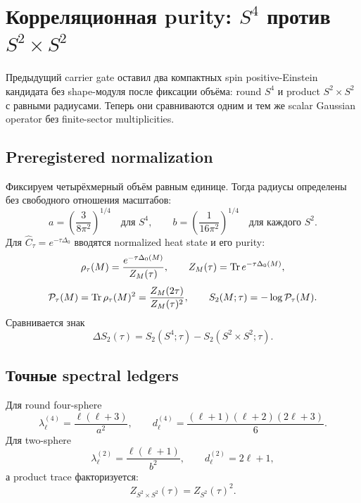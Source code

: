 \chapter{Корреляционная purity: \texorpdfstring{\(S^4\)}{S4} против \texorpdfstring{\(S^2\times S^2\)}{S2 x S2}}

Предыдущий carrier gate оставил два компактных spin positive-Einstein
кандидата без shape-модуля после фиксации объёма: round \(S^4\) и product
\(S^2\times S^2\) с равными радиусами. Теперь они сравниваются одним и тем
же scalar Gaussian operator без finite-sector multiplicities.

\section{Preregistered normalization}

Фиксируем четырёхмерный объём равным единице. Тогда радиусы определены без
свободного отношения масштабов:
\begin{equation}
 a=\left(\frac{3}{8\pi^2}\right)^{1/4}
 \quad\text{для }S^4,
 \qquad
 b=\left(\frac{1}{16\pi^2}\right)^{1/4}
 \quad\text{для каждого }S^2.
\end{equation}
Для \(\widehat C_\tau=e^{-\tau\Delta_0}\) вводятся normalized heat state и
его purity:
\begin{equation}
 \rho_\tau(M)=\frac{e^{-\tau\Delta_0(M)}}{Z_M(\tau)},
 \qquad
 Z_M(\tau)=\operatorname{Tr} e^{-\tau\Delta_0(M)},
\end{equation}
\begin{equation}
 \mathcal P_\tau(M)=\operatorname{Tr}\rho_\tau(M)^2
 =\frac{Z_M(2\tau)}{Z_M(\tau)^2},
 \qquad
 S_2(M;\tau)=-\log\mathcal P_\tau(M).
 \label{eq:carrier-renyi2-definition}
\end{equation}
Сравнивается знак
\begin{equation}
 \Delta S_2(\tau)
 =S_2(S^4;\tau)-S_2(S^2\times S^2;\tau).
\end{equation}

\section{Точные spectral ledgers}

Для round four-sphere
\begin{equation}
 \lambda_\ell^{(4)}=\frac{\ell(\ell+3)}{a^2},
 \qquad
 d_\ell^{(4)}=\frac{(\ell+1)(\ell+2)(2\ell+3)}6.
\end{equation}
Для two-sphere
\begin{equation}
 \lambda_\ell^{(2)}=\frac{\ell(\ell+1)}{b^2},
 \qquad
 d_\ell^{(2)}=2\ell+1,
\end{equation}
а product trace факторизуется:
\begin{equation}
 Z_{S^2\times S^2}(\tau)=Z_{S^2}(\tau)^2.
\end{equation}

